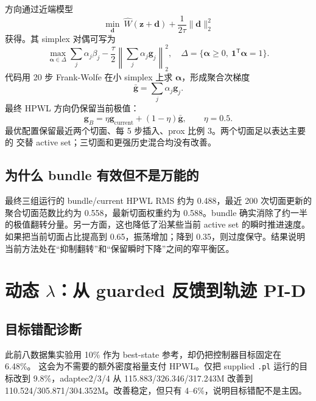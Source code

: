 \documentclass[UTF8,fontset=windows,a4paper,11pt]{ctexart}
\newcommand{\code}[1]{\texttt{#1}}
\begin{document}
方向通过近端模型
\begin{equation}
 \min_{\bm d}\ \widehat W(\bm z+\bm d)+\frac{1}{2\tau}\|\bm d\|_2^2
 \label{eq:proxprimal}
\end{equation}
获得。其 simplex 对偶可写为
\begin{equation}
 \max_{\bm\alpha\in\Delta}
 \sum_j\alpha_j\beta_j-
 \frac{\tau}{2}\left\|\sum_j\alpha_j\bm g_j\right\|_2^2,
 \quad
 \Delta=\{\bm\alpha\geq0,\ \bm 1^\mathsf{T}\bm\alpha=1\}.
 \label{eq:proxdual}
\end{equation}
代码用 20 步 Frank-Wolfe 在小 simplex 上求 $\bm\alpha$，形成聚合次梯度
\begin{equation}
  \bar{\bm g}=\sum_j\alpha_j\bm g_j.
\end{equation}
最终 HPWL 方向仍保留当前极值：
\begin{equation}
  \bm g_B=\eta\bm g_{\mathrm{current}}+(1-\eta)\bar{\bm g},
  \qquad \eta=0.5.
 \label{eq:mix}
\end{equation}
最优配置保留最近两个切面、每 5 步插入、prox 比例 3。两个切面足以表达主要的
交替 active set；三切面和更强历史混合均没有改善。

\subsection{为什么 bundle 有效但不是万能的}

最终三组运行的 bundle/current HPWL RMS 约为 0.488，最近 200 次切面更新的
聚合切面范数比约为 0.558，最新切面权重约为 0.588。bundle 确实消除了约一半
的极值翻转分量。另一方面，这也降低了沿某些当前 active set 的瞬时推进速度。
如果把当前切面占比提高到 0.65，振荡增加；降到 0.35，则过度保守。结果说明
当前方法处在“抑制翻转”和“保留瞬时下降”之间的窄平衡区。

\section{动态 \texorpdfstring{$\lambda$}{lambda}：从 guarded 反馈到轨迹 PI-D}

\subsection{目标错配诊断}

此前八数据集实验用 10\% 作为 best-state 参考，却仍把控制器目标固定在 6.48\%。
这会为不需要的额外密度裕量支付 HPWL。仅把 supplied \code{.pl} 运行的目标改到
9.8\%，adaptec2/3/4 从 115.883/326.346/317.243M 改善到
110.524/305.871/304.352M。改善稳定，但只有 4--6\%，说明目标错配不是主因。
\end{document}
